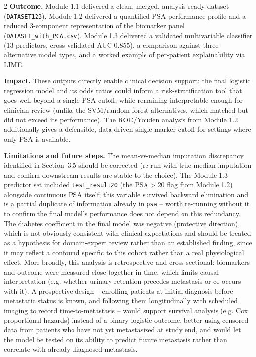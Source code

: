 ﻿\documentclass[a4paper,10pt]{article}
\begin{document}
\begin{multicols*}{2}
\textbf{Outcome.} Module 1.1 delivered a clean, merged, analysis-ready dataset (\texttt{DATASET123}). Module 1.2 delivered a quantified PSA performance profile and a reduced 3-component representation of the biomarker panel (\texttt{DATASET\_with\_PCA.csv}). Module 1.3 delivered a validated multivariable classifier (13 predictors, cross-validated AUC 0.855), a comparison against three alternative model types, and a worked example of per-patient explainability via LIME.

\textbf{Impact.} These outputs directly enable clinical decision support: the final logistic regression model and its odds ratios could inform a risk-stratification tool that goes well beyond a single PSA cutoff, while remaining interpretable enough for clinician review (unlike the SVM/random forest alternatives, which matched but did not exceed its performance). The ROC/Youden analysis from Module 1.2 additionally gives a defensible, data-driven single-marker cutoff for settings where only PSA is available.

\textbf{Limitations and future steps.} The mean-vs-median imputation discrepancy identified in Section~3.5 should be corrected (re-run with true median imputation and confirm downstream results are stable to the choice). The Module 1.3 predictor set included \texttt{test\_result20} (the PSA$>$20 flag from Module 1.2) alongside continuous PSA itself; this variable survived backward elimination and is a partial duplicate of information already in \texttt{psa} -- worth re-running without it to confirm the final model's performance does not depend on this redundancy. The diabetes coefficient in the final model was negative (protective direction), which is not obviously consistent with clinical expectations and should be treated as a hypothesis for domain-expert review rather than an established finding, since it may reflect a confound specific to this cohort rather than a real physiological effect. More broadly, this analysis is retrospective and cross-sectional: biomarkers and outcome were measured close together in time, which limits causal interpretation (e.g. whether urinary retention precedes metastasis or co-occurs with it). A prospective design -- enrolling patients at initial diagnosis before metastatic status is known, and following them longitudinally with scheduled imaging to record time-to-metastasis -- would support survival analysis (e.g. Cox proportional hazards) instead of a binary logistic outcome, better using censored data from patients who have not yet metastasized at study end, and would let the model be tested on its ability to predict future metastasis rather than correlate with already-diagnosed metastasis.

\end{multicols*}
\end{document}

